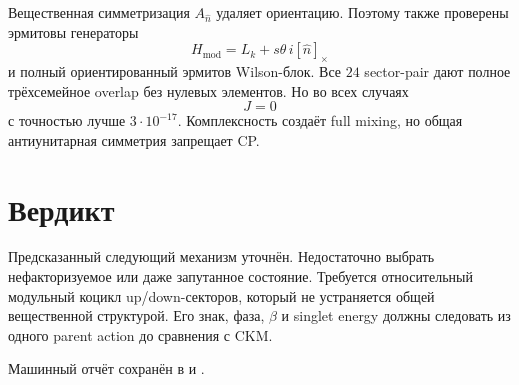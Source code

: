 \documentclass[12pt,a4paper]{article}
\begin{document}
Вещественная симметризация \(A_{\hat n}\) удаляет ориентацию. Поэтому также
проверены эрмитовы генераторы
\[
 H_{\mathrm{mod}}=L_k+s\theta\,i[\hat n]_\times
\]
и полный ориентированный эрмитов Wilson-блок. Все \(24\) sector-pair дают
полное трёхсемейное overlap без нулевых элементов. Но во всех случаях
\[
 J=0
\]
с точностью лучше \(3\cdot10^{-17}\). Комплексность создаёт full mixing, но
общая антиунитарная симметрия запрещает CP.

\section{Вердикт}

Предсказанный следующий механизм уточнён. Недостаточно выбрать
нефакторизуемое или даже запутанное состояние. Требуется относительный
модульный коцикл up/down-секторов, который не устраняется общей вещественной
структурой. Его знак, фаза, \(\beta\) и singlet energy должны следовать из
одного parent action до сравнения с CKM.

Машинный отчёт сохранён в
 и
.
\end{document}
